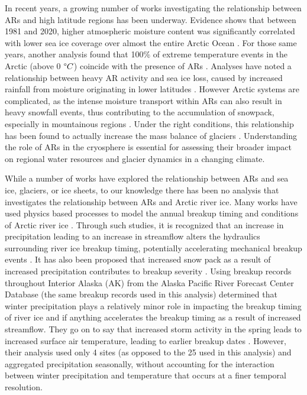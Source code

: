 \documentclass[12pts,draft]{AR_analysis_}
\begin{document}
In recent years, a growing number of works 
investigating the relationship between ARs and 
high latitude regions has been underway. Evidence shows that between
1981 and 2020, higher atmospheric moisture content was significantly correlated
with lower sea ice coverage over almost the entire Arctic Ocean
\cite{ARs_lead_to_sea_ice_loss}. For those same years, another analysis
found that 100\% of extreme temperature events in the Arctic (above 0
$\degree C$) coincide with the presence of ARs \cite{Ma2023}. Analyses have noted
a relationship between heavy AR activity and sea ice loss, caused by
increased rainfall from moisture originating in lower latitudes
\cite{Zhang2023, maclennan_contribution_2022}. However Arctic systems
are complicated, as the intense moisture transport within ARs can also
result in heavy snowfall events, thus contributing to the accumulation
of snowpack, especially in mountainous regions \cite{Saavedra2020,
Guan2010}. Under the right conditions, this relationship has been found
to actually increase the mass balance of glaciers \cite{Little2019}.
Understanding the role of ARs in the cryosphere is essential for
assessing their broader impact on regional water resources and glacier
dynamics in a changing climate. 

While a number of works have explored
the relationship between ARs and sea ice, glaciers, or ice sheets, 
to our knowledge there has
been no analysis that investigates the relationship between ARs and Arctic
river ice. Many works have used physics based processes
to model the annual breakup timing and conditions of Arctic river ice
\cite{Paily, ashton1986river, Prowse_Bonsal_Duguay_Lacroix_2007,
jasek1998, shen_newest}. Through such studies, it is recognized that an 
increase in precipitation leading to an increase in
streamflow alters the hydraulics surrounding river ice breakup timing, 
potentially accelerating mechanical breakup events \cite{ashton1986river}.
It has also been proposed that increased snow pack as a result of increased 
precipitation contributes to breakup severity \cite{Prowes2002}. Using 
breakup records throughout Interior Alaska (AK) from the Alaska 
Pacific River Forecast Center Database
(the same breakup records used in this analysis)  determined 
that winter precipitation plays a relatively minor role in impacting the 
breakup timing of river ice and if anything accelerates the breakup timing as a 
result of increased streamflow. They go on to say that 
increased storm activity in the spring leads to increased surface air 
temperature, leading to earlier breakup dates \cite{Bieniek2011}. However, 
their analysis used only 4 sites (as opposed to the 25 used in this analysis) 
and aggregated precipitation seasonally, without accounting for the interaction 
between winter precipitation and temperature that occurs at a finer temporal
resolution. 
\end{document}
